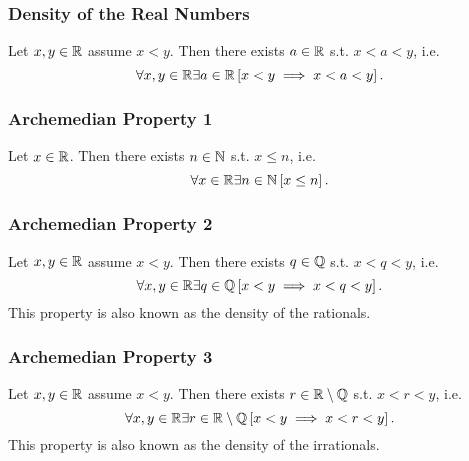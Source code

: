 \subsubsection*{Density of the Real Numbers}
\uthm Let $x,y \in \mathbb{R}$ assume $x < y$. Then there exists $a \in \mathbb{R}$ s.t.
$x < a < y$, i.e.
\begin{equation*}
    \forall x, y \in \mathbb{R} \exists a \in \mathbb{R} \left[ x < y \implies x < a < y \right].
\end{equation*}


\subsubsection*{Archemedian Property 1}
\uthm Let $x \in \mathbb{R}$. Then there exists $n \in \mathbb{N}$ s.t. $x \leq n$, i.e.
\begin{equation*}
    \forall x \in \mathbb{R} \exists n \in \mathbb{N} \left[ x \leq n \right].
\end{equation*}


\subsubsection*{Archemedian Property 2}
\uthm Let $x,y \in \mathbb{R}$ assume $x < y$. Then there exists $q \in \mathbb{Q}$ s.t. $x < q < y$,
i.e.
\begin{equation*}
    \forall x, y \in \mathbb{R} \exists q \in \mathbb{Q} \left[ x < y \implies x < q < y \right].
\end{equation*}
This property is also known as the density of the rationals.


\subsubsection*{Archemedian Property 3}
\uthm Let $x,y \in \mathbb{R}$ assume $x < y$. Then there exists $r \in \mathbb{R} \setminus \mathbb{Q}$
s.t. $x < r < y$, i.e.
\begin{equation*}
    \forall x, y \in \mathbb{R} \exists r \in \mathbb{R} \setminus \mathbb{Q} \left[ x < y \implies x < r < y \right].
\end{equation*}
This property is also known as the density of the irrationals.

